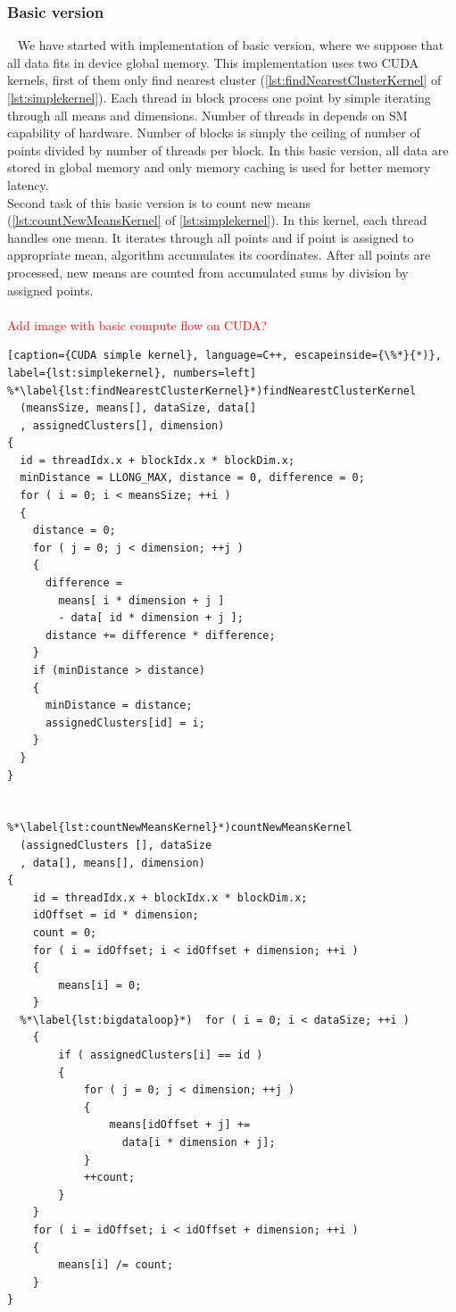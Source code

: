 \subsubsection{Basic version}~\label{sssec:basicversion}
We have started with implementation of basic version, where we suppose that all data fits in device global memory. This implementation uses two CUDA kernels, first of them only find nearest cluster (\autoref{lst:findNearestClusterKernel} of \autoref{lst:simplekernel}). Each thread in block process one point by simple iterating through all means and dimensions. Number of threads in depends on SM capability of hardware. Number of blocks is simply the ceiling of number of points divided by number of threads per block. In this basic version, all data are stored in global memory and only memory caching is used for better memory latency. \\
Second task of this basic version is to count new means (\autoref{lst:countNewMeansKernel} of \autoref{lst:simplekernel}). In this kernel, each thread handles one mean. It iterates through all points and if point is assigned to appropriate mean, algorithm accumulates its coordinates. After all points are processed, new means are counted from accumulated sums by division by assigned points.\\
\\
\textcolor{red}{Add image with basic compute flow on CUDA?}
\\
\begin{lstlisting}[caption={CUDA simple kernel}, language=C++, escapeinside={\%*}{*)}, label={lst:simplekernel}, numbers=left]
%*\label{lst:findNearestClusterKernel}*)findNearestClusterKernel
  (meansSize, means[], dataSize, data[]
  , assignedClusters[], dimension)
{
  id = threadIdx.x + blockIdx.x * blockDim.x;
  minDistance = LLONG_MAX, distance = 0, difference = 0;
  for ( i = 0; i < meansSize; ++i )
  {
    distance = 0;
    for ( j = 0; j < dimension; ++j )
    {
      difference =
        means[ i * dimension + j ]
        - data[ id * dimension + j ];
      distance += difference * difference;
    }
    if (minDistance > distance)
    {
      minDistance = distance;
      assignedClusters[id] = i;
    }
  }
}


%*\label{lst:countNewMeansKernel}*)countNewMeansKernel
  (assignedClusters [], dataSize
  , data[], means[], dimension)
{
    id = threadIdx.x + blockIdx.x * blockDim.x;
    idOffset = id * dimension;
    count = 0;
    for ( i = idOffset; i < idOffset + dimension; ++i )
    {
        means[i] = 0;
    }
  %*\label{lst:bigdataloop}*)  for ( i = 0; i < dataSize; ++i )
    {
        if ( assignedClusters[i] == id )
        {
            for ( j = 0; j < dimension; ++j )
            {
                means[idOffset + j] +=
                  data[i * dimension + j];
            }
            ++count;
        }
    }
    for ( i = idOffset; i < idOffset + dimension; ++i )
    {
        means[i] /= count;
    }
}
\end{lstlisting}

